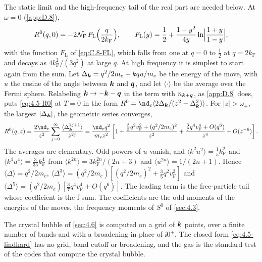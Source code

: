 The static limit and the high-frequency tail of the real part are needed below. At $\omega = 0$ (\cref{app:D.8}),
\begin{equation}
  R^0(q,0) = -2\mathcal{N}_{\mathrm{F}}\,F_{\mathrm{L}}\Bigl(\frac{q}{2k_{\mathrm{F}}}\Bigr), \qquad
  F_{\mathrm{L}}(y) = \frac12 + \frac{1 - y^2}{4y}\ln\Bigl|\frac{1 + y}{1 - y}\Bigr| ,
  \label{eq:4.5-static}
\end{equation}
with the function $F_{\mathrm{L}}$ of \cref{eq:C.8-FL}, which falls from one at $q = 0$ to $\tfrac12$ at $q = 2k_{\mathrm{F}}$ and decays as $4k_{\mathrm{F}}^2/(3q^2)$ at large $q$. At high frequency it is simplest to start again from the sum. Let $\Delta_{\bm{k}} = q^2/2m_e + kqu/m_e$ be the energy of the move, with $u$ the cosine of the angle between $\bm{k}$ and $\bm{q}$, and let $\langle\cdot\rangle$ be the average over the Fermi sphere. Relabeling $\bm{k} \to -\bm{k} - \bm{q}$ in the term with $n_{\bm{k}+\bm{q}}$, as \cref{app:D.8} does, puts \cref{eq:4.5-R0} at $T = 0$ in the form $R^0 = \nd_e\langle 2\Delta_{\vect{k}}/(z^2 - \Delta_{\vect{k}}^2)\rangle$. For $|z| > \omega_+$, the largest $|\Delta_{\bm{k}}|$, the geometric series converges,
\begin{equation}
  R^0(q,z) = \frac{2\nd_e}{z^2}\sum_{j=0}^\infty\frac{\langle\Delta_{\vect{k}}^{2j+1}\rangle}{z^{2j}}
  = \frac{\nd_eq^2}{m_ez^2}\left[1 + \frac{\tfrac35q^2v_{\mathrm{F}}^2 + (q^2/2m_e)^2}{z^2} + \frac{\tfrac37q^4v_{\mathrm{F}}^4 + O(q^6)}{z^4} + O(z^{-6})\right] .
  \label{eq:4.5-moments}
\end{equation}
The averages are elementary. Odd powers of $u$ vanish, and $\langle k^2u^2\rangle = \tfrac15k_{\mathrm{F}}^2$ and $\langle k^4u^4\rangle = \tfrac{3}{35}k_{\mathrm{F}}^4$ from $\langle k^{2n}\rangle = 3k_{\mathrm{F}}^{2n}/(2n + 3)$ and $\langle u^{2n}\rangle = 1/(2n + 1)$. Hence $\langle\Delta\rangle = q^2/2m_e$, $\langle\Delta^3\rangle = (q^2/2m_e)[(q^2/2m_e)^2 + \tfrac35q^2v_{\mathrm{F}}^2]$ and $\langle\Delta^5\rangle = (q^2/2m_e)[\tfrac37q^4v_{\mathrm{F}}^4 + O(q^6)]$. The leading term is the free-particle tail whose coefficient is the f-sum. The coefficients are the odd moments of the energies of the moves, the frequency moments of $S^0$ of \cref{sec:4.3}.

The crystal bubble of \cref{sec:4.6} is computed on a grid of $\bm{k}$ points, over a finite number of bands and with a broadening in place of $\ii0^+$. The closed form \cref{eq:4.5-lindhard} has no grid, band cutoff or broadening, and the gas is the standard test of the codes that compute the crystal bubble.

